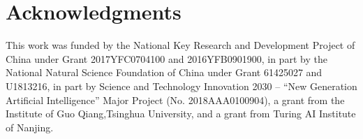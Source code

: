 \documentclass{article}
\begin{document}








\section*{Acknowledgments}

This work was funded by the National Key Research and Development Project of China under Grant 2017YFC0704100 and 2016YFB0901900, in part by the National Natural Science Foundation of China under Grant 61425027 and U1813216, in part by Science and Technology Innovation 2030 – “New Generation Artificial Intelligence” Major Project (No. 2018AAA0100904), a grant from the Institute of Guo Qiang,Tsinghua University, and a grant from Turing AI Institute of Nanjing.





\end{document}
